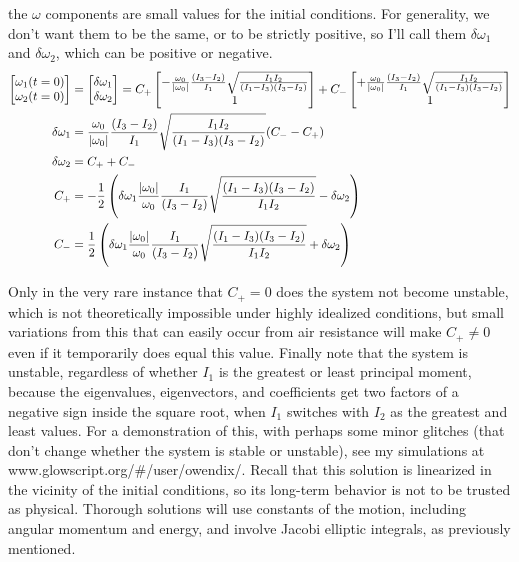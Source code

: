 \documentclass[10pt]{article}
\begin{document}
the $\omega$ components are small values for the initial conditions. 
For generality, we don't want them to be the same, or to be strictly 
positive, so I'll call them $\delta\omega_1$ and 
$\delta\omega_2$, which can be positive or negative.
\begin{align}
    \begin{bmatrix}
        \omega_1(t=0) \\
        \omega_2(t=0)
    \end{bmatrix}
    &= 
    \begin{bmatrix}
        \delta\omega_1 \\
        \delta\omega_2
    \end{bmatrix}
    =C_+
    \begin{bmatrix}
        -\frac{\omega_0}{|\omega_0|}\frac{(I_3-I_2)}{I_1}
            \sqrt{\frac{I_1I_2}{(I_1-I_3)(I_3-I_2)}} \\
        1
    \end{bmatrix}
    + C_-
    \begin{bmatrix}
        +\frac{\omega_0}{|\omega_0|}\frac{(I_3-I_2)}{I_1}
            \sqrt{\frac{I_1I_2}{(I_1-I_3)(I_3-I_2)}} \\
        1
    \end{bmatrix} \notag\\
    \delta\omega_1 &=
            \frac{\omega_0}{|\omega_0|}\frac{(I_3-I_2)}{I_1}
            \sqrt{\frac{I_1I_2}{(I_1-I_3)(I_3-I_2)}}(C_- - C_+) 
        \notag\\
    \delta\omega_2 &= C_+ + C_- \notag\\
    C_+ &= -\frac{1}{2}\left(\delta\omega_1 
            \frac{|\omega_0|}{\omega_0}\frac{I_1}{(I_3-I_2)}
            \sqrt{\frac{(I_1-I_3)(I_3-I_2)}{I_1I_2}}
            -\delta\omega_2\right) \\
    C_- &= \frac{1}{2}\left(\delta\omega_1 
            \frac{|\omega_0|}{\omega_0}\frac{I_1}{(I_3-I_2)}
            \sqrt{\frac{(I_1-I_3)(I_3-I_2)}{I_1I_2}}
            +\delta\omega_2\right)
\end{align}

Only in the very rare instance that $C_+=0$ does the system not become 
unstable, which is not theoretically impossible under highly idealized 
conditions, but small variations from this that can easily occur from air 
resistance will make $C_+\neq0$ even if it temporarily does equal this value. 
Finally note that the system is unstable, 
regardless of whether $I_1$ is the greatest or least principal moment, because 
the eigenvalues, eigenvectors, and coefficients get two factors of a negative 
sign inside the square root, when $I_1$ switches with $I_2$ as the greatest 
and least values. For a demonstration of this, with perhaps some minor 
glitches (that don't change whether the system is stable or unstable), 
see my simulations at www.glowscript.org/\#/user/owendix/. Recall that this 
solution is linearized in the vicinity of the initial conditions, so its 
long-term behavior is not to be trusted as physical. Thorough solutions 
will use constants of the motion, including angular momentum and 
energy, and involve Jacobi elliptic integrals, as previously mentioned.
\end{document}
